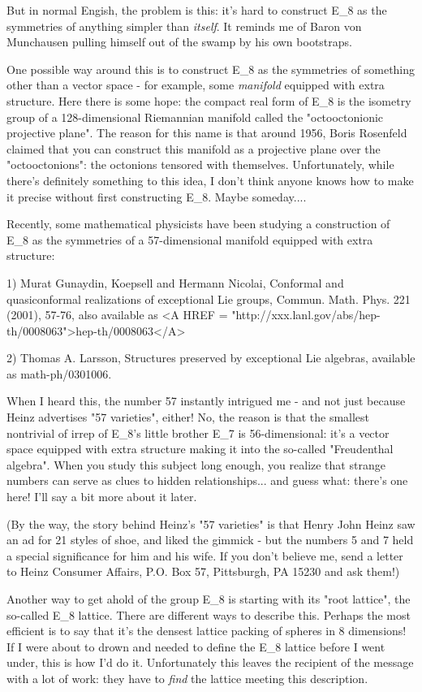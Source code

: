But in normal Engish, the problem is this: it's hard to construct E_{8} as
the symmetries of anything simpler than \emph{itself}.  It reminds me of
Baron von Munchausen pulling himself out of the swamp by his own
bootstraps.  

One possible way around this is to construct E_{8} as the symmetries of
something other than a vector space - for example, some \emph{manifold}
equipped with extra structure.  Here there is some hope: the compact
real form of E_{8} is the isometry group of a 128-dimensional Riemannian
manifold called the "octooctonionic projective plane".  The reason for
this name is that around 1956, Boris Rosenfeld claimed that you can
construct this manifold as a projective plane over the "octooctonions":
the octonions tensored with themselves.  Unfortunately, while there's
definitely something to this idea, I don't think anyone knows how to
make it precise without first constructing E_{8}.  Maybe someday....

Recently, some mathematical physicists have been studying a construction
of E_{8} as the symmetries of a 57-dimensional manifold equipped with extra
structure:

1) Murat Gunaydin, Koepsell and Hermann Nicolai, Conformal and
quasiconformal realizations of exceptional Lie groups,
Commun. Math. Phys. 221 (2001), 57-76, also available as <A HREF = "http://xxx.lanl.gov/abs/hep-th/0008063">hep-th/0008063</A>

2) Thomas A. Larsson, Structures preserved by exceptional Lie algebras,
available as math-ph/0301006.

When I heard this, the number 57 instantly intrigued me - and not just
because Heinz advertises "57 varieties", either!  No, the reason is that
the smallest nontrivial of irrep of E_{8}'s little brother E_{7} is
56-dimensional: it's a vector space equipped with extra structure making
it into the so-called "Freudenthal algebra".  When you study this
subject long enough, you realize that strange numbers can serve as clues
to hidden relationships... and guess what: there's one here!  I'll
say a bit more about it later.

(By the way, the story behind Heinz's "57 varieties" is that Henry John
Heinz saw an ad for 21 styles of shoe, and liked the gimmick - but the
numbers 5 and 7 held a special significance for him and his wife.  If
you don't believe me, send a letter to Heinz Consumer Affairs, P.O. Box 57, 
Pittsburgh, PA 15230 and ask them!)

Another way to get ahold of the group E_{8} is starting with its "root
lattice", the so-called E_{8} lattice.  There are different ways to
describe this.  Perhaps the most efficient is to say that it's the
densest lattice packing of spheres in 8 dimensions!  If I were about to
drown and needed to define the E_{8} lattice before I went under, this is
how I'd do it.  Unfortunately this leaves the recipient of the message
with a lot of work: they have to \emph{find} the lattice meeting this
description.


